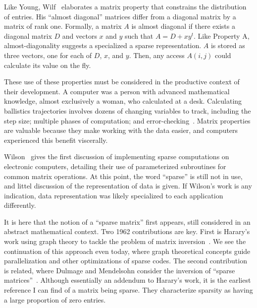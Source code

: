 Like Young, Wilf~\cite{wilf1960almost} elaborates a matrix property that constrains the distribution of entries. 
His \enquote{almost diagonal} matrices differ from a diagonal matrix by a matrix of rank one. 
Formally, a matrix $A$ is almost diagonal if there exists a diagonal matrix $D$ and vectors $x$ and $y$ such that $A = D + xy^t$. 
Like Property A, almost-diagonality suggests a specialized a sparse representation.
$A$ is stored as three vectors, one for each of $D$, $x$, and $y$.
Then, any access $A(i,j)$ could calculate its value on the fly.

These use of these properties must be considered in the productive context of their development. 
A computer was a person with advanced mathematical knowledge, almost exclusively a woman, who calculated at a desk. 
Calculating ballistics trajectories involves dozens of changing variables to track, including the step size; multiple phases of computation; and error-checking~\cite{light1999computers}. 
Matrix properties are valuable because they make working with the data easier, and computers experienced this benefit viscerally.  





Wilson~\cite{wilson1959solution} gives the first discussion of implementing sparse computations on electronic computers, detailing their use of parameterized subroutines for common matrix operations. 
At this point, the word \enquote{sparse} is still not in use, and littel discussion of the representation of data is given.
If Wilson's work is any indication, data representation was likely specialized to each application differently. 



It is here that the notion of a \enquote{sparse matrix} first appears, still considered in an abstract mathematical context. 
Two 1962 contributions are key.
First is Harary's work using graph theory to tackle the problem of matrix inversion~\cite{harary1962graph}.
We see the continuation of this approach even today, where graph theoretical concepts guide parallelization and other optimizations of sparse codes.
The second contribution is related, where Dulmage and Mendelsohn consider the inversion of \enquote{sparse matrices}~\cite{dulmage1962inversion}.
Although essentially an addendum to Harary's work, it is the earliest reference I can find of a matrix being sparse.
They characterize sparsity as having a large proportion of zero entries.


